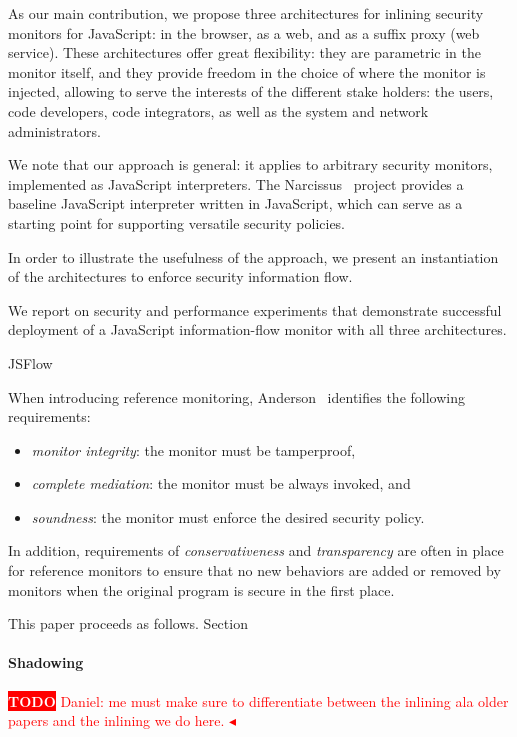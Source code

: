 \documentclass{llncs}
\newcommand{\todo}[1]{\colorbox{red}{\textcolor{white}{\sffamily\bfseries\scriptsize TODO}} \textcolor{red}{#1} \textcolor{red}{$\blacktriangleleft$}}
\begin{document}
As our main contribution,
we propose three architectures for inlining security monitors for JavaScript: in
the browser, as a web, and as a suffix proxy (web service). 
%
These architectures offer great flexibility: they are parametric in the monitor itself,
and they provide freedom in the choice of where the monitor is
injected, allowing to serve the interests of the different stake
holders: the users, code developers, code
integrators, as well as the system and network administrators.

We note that our approach is general: it applies to arbitrary security
monitors, implemented as JavaScript interpreters. The 
 Narcissus~\cite{Narcissus} project provides a baseline JavaScript
 interpreter written in JavaScript, which can serve as a starting
 point for supporting versatile security policies.

In order to illustrate the usefulness of the approach, we present an
instantiation of the architectures to enforce security information flow. 

We report on security and performance experiments that demonstrate successful deployment of a JavaScript
information-flow monitor with all three architectures.

JSFlow~\cite{Hedin:Sabelfeld:CSF12,JSFlow} 

When introducing reference monitoring, Anderson~\cite{Anderson:72}
identifies the following requirements:
\begin{itemize}
\item \emph{monitor integrity}: the monitor must be tamperproof,
\item \emph{complete mediation}: the monitor must be always invoked, and
\item \emph{soundness}: the monitor must enforce the desired
  security policy.
\end{itemize}
In addition, requirements of \emph{conservativeness} and
\emph{transparency} are often in place for reference monitors to
ensure that no new behaviors are added or removed by monitors when the
original program is secure in the first place.

This paper proceeds as follows. Section~



\paragraph{Shadowing}
\todo{Daniel: me must make sure to differentiate between the inlining ala older papers and the inlining we do here.}
\end{document}

